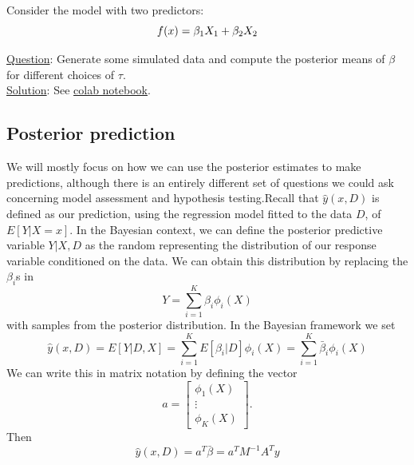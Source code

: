 \begin{example}\label{ex:regpostmean}

Consider the model with two predictors:
\begin{equation*}
f(x) = \beta_1X_1 + \beta_2X_2\\
\end{equation*}


\noindent 
\underline{Question}: Generate some simulated data and compute the posterior means of $\beta$ for different choices of $\tau$. \\


\noindent 
\underline{Solution}: See  \href{https://colab.research.google.com/drive/1sFlY0nvo7hrsNYGRdx8C4tKPihyOSmbx?usp=sharing}{colab notebook}. 

\end{example}




\subsection{Posterior prediction}


 We will mostly focus on how we can use the posterior estimates to make predictions, although there is an entirely different set of questions we could ask concerning model assessment and hypothesis testing.Recall that $\hat{y}(x,D)$ is defined as our prediction, using the regression model fitted to the data $D$, of $E[Y|X=x]$. In the Bayesian context, we can define the posterior predictive variable $Y|X,D$ as the random representing the distribution of our response variable conditioned on the data. We can obtain this distribution by replacing the $\beta_i$s in 
\begin{equation*}
Y = \sum_{i=1}^{K}\beta_i\phi_i(X)
\end{equation*}
with samples from the posterior distribution. In the Bayesian framework we set
\begin{equation*}
\hat{y}(x,D) = E[Y|D,X] = \sum_{i=1}^{K}E[\beta_i|D]\phi_i(X) = \sum_{i=1}^{K}\bar{\beta}_i\phi_i(X) 
\end{equation*}
We can write this in matrix notation by defining the vector 
\begin{equation*}
a = \left[\begin{array}{c}
\phi_1(X)\\
\vdots\\
\phi_K(X)
\end{array}\right].
\end{equation*}
Then 
\begin{equation}\label{eq:yhatmatrixform}
\hat{y}(x,D) = a^T\bar{\beta} = a^TM^{-1}A^Ty
\end{equation}


